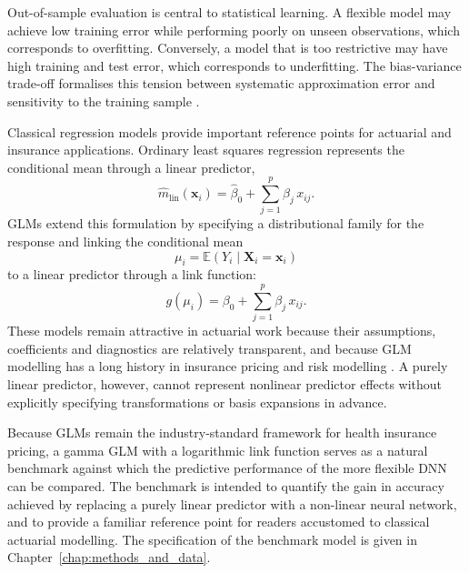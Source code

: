   \noindent
  Out-of-sample evaluation is central to statistical learning. A flexible model
  may achieve low training error while performing poorly on unseen observations,
  which corresponds to overfitting. Conversely, a model that is too restrictive
  may have high training and test error, which corresponds to underfitting. The
  bias-variance trade-off formalises this tension between systematic
  approximation error and sensitivity to the training sample
  \citep{james2021introduction,hastie2009elements}.

  \noindent
  Classical regression models provide important reference points for actuarial and
  insurance applications. Ordinary least squares regression represents the
  conditional mean through a linear predictor,
  \begin{equation}
  \label{eq:linear_regression_predictor}
      \widehat{m}_{\mathrm{lin}}(\mathbf{x}_i)
      =
      \widehat{\beta}_{0}
      +
      \sum_{j=1}^{p}
      \widehat{\beta}_{j}\,x_{ij}.
  \end{equation}
  GLMs extend this formulation by specifying a distributional
  family for the response and linking the conditional mean
  \begin{equation}
  \label{eq:conditional_mean}
      \mu_i
      =
      \mathbb{E}(Y_i\mid \mathbf{X}_i=\mathbf{x}_i)
  \end{equation}
  to a linear predictor through a link function:
  \begin{equation}
  \label{eq:glm_link}
      g(\mu_i)
      =
      \beta_{0}
      +
      \sum_{j=1}^{p}
      \beta_{j}\,x_{ij}.
  \end{equation}
  These models remain attractive in actuarial work because their assumptions,
  coefficients and diagnostics are relatively transparent, and because
  GLM modelling has a long history in insurance pricing and risk modelling \citep{dobson2008introduction,denuit2007actuarial}. A purely linear predictor, however, cannot represent nonlinear predictor effects without explicitly specifying transformations or basis expansions in advance.

  \noindent
  Because GLMs remain the industry-standard framework for health
  insurance pricing, a gamma GLM with a logarithmic link function serves as a
  natural benchmark against which the predictive performance of the more
  flexible DNN can be compared.  The benchmark is intended to quantify
  the gain in accuracy achieved by replacing a purely linear predictor with a
  non-linear neural network, and to provide a familiar reference point for
  readers accustomed to classical actuarial modelling.  The specification of
  the benchmark model is given in Chapter~\ref{chap:methods_and_data}.
  
